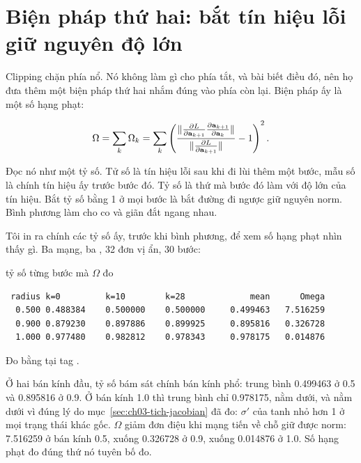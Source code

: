 \section{Biện pháp thứ hai: bắt tín hiệu lỗi giữ nguyên độ lớn}
\label{sec:ch03-regularizer}

%
Clipping chặn phía nổ. Nó không làm gì cho phía tắt, và bài biết điều đó, nên
họ đưa thêm một biện pháp thứ hai nhắm đúng vào phía còn lại. Biện pháp ấy là
một số hạng phạt:

\begin{equation}
  \Omega = \sum_k \Omega_k
         = \sum_k \left(
             \frac{\lVert  \frac{\partial L}{\partial \mathbf{a}_{k+1}} \frac{\partial \mathbf{a}_{k+1}}{\partial \mathbf{a}_k}  \rVert}
                  {\lVert  \frac{\partial L}{\partial \mathbf{a}_{k+1}}  \rVert}
             - 1
           \right)^{2}.
  \label{eq:ch03-omega}
\end{equation}

Đọc nó như một tỷ số. Tử số là tín hiệu lỗi sau khi đi lùi thêm một bước, mẫu
số là chính tín hiệu ấy trước bước đó. Tỷ số là thứ mà bước đó làm với độ lớn
của tín hiệu. Bắt tỷ số bằng 1 ở mọi bước là bắt đường đi ngược giữ nguyên
norm. Bình phương làm cho co và giãn đắt ngang nhau.

Tôi in ra chính các tỷ số ấy, trước khi bình phương, để xem số hạng phạt nhìn
thấy gì. Ba mạng, ba , 32 đơn vị ẩn, 30 bước:

\begin{measured}{tỷ số từng bước mà \(\Omega\) đo}
\begin{verbatim}
 radius k=0         k=10        k=28             mean      Omega
  0.500 0.488384    0.500000    0.500000     0.499463   7.516259
  0.900 0.879230    0.897886    0.899925     0.895816   0.326728
  1.000 0.977480    0.982812    0.978343     0.978175   0.014876
\end{verbatim}

Đo bằng  tại tag .
\end{measured}

Ở hai bán kính đầu, tỷ số bám sát chính bán kính phổ: trung bình 0.499463 ở 0.5
và 0.895816 ở 0.9. Ở bán kính 1.0 thì trung bình chỉ 0.978175, nằm dưới, và nằm
dưới vì đúng lý do mục~\ref{sec:ch03-tich-jacobian} đã đo: \(\sigma'\) của tanh
nhỏ hơn 1 ở mọi trạng thái khác gốc. \(\Omega\) giảm đơn điệu khi mạng tiến về
chỗ giữ được norm: 7.516259 ở bán kính 0.5, xuống 0.326728 ở 0.9, xuống 0.014876
ở 1.0. Số hạng phạt đo đúng thứ nó tuyên bố đo.

